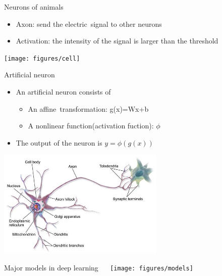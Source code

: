 \documentclass{beamer}
\begin{document}
\begin{CJK*}{UTF8}{gbsn}
\begin{frame}{Neurons of animals}
\begin{itemize}
\item Axon: send the electric signal to other neurons

\item Activation: the intensity of the signal is larger than the threshold 


\end{itemize}
\begin{center}
\texttt{[image: figures/cell]}
\end{center}
\end{frame}


\begin{frame}{Artificial neuron}

\begin{itemize}
\item An artificial neuron consists of
\begin{itemize}
\item An affine transformation:  g(x)=Wx+b

\item A nonlinear function(activation fuction): $\phi$
\end{itemize}
\item The output of the neuron is $y=\phi(g(x))$

\end{itemize}
\begin{center}
\includegraphics[width=0.6\textwidth]{figures/neuron}
\end{center}
\end{frame}


\begin{frame}{Major models in deep learning}
\centering  
\texttt{[image: figures/models]}
\end{frame}





\end{CJK*}
\end{document}
